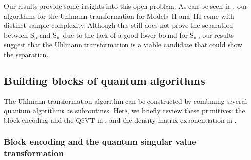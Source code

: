 Our results provide some insights into this open problem.
As can be seen in , our algorithms for the Uhlmann transformation for Models~II and~III come with distinct sample complexity.
Although this still does not prove the separation between $\mathrm{S}_{\mathrm{p}}$ and $\mathrm{S}_{\mathrm{m}}$ due to the lack of a good lower bound for $\mathrm{S}_{\mathrm{m}}$, our results suggest that the Uhlmann transformation is a viable candidate that could show the separation.











\subsection{Building blocks of quantum algorithms}
\label{sec:previous key subroutine}


The Uhlmann transformation algorithm can be constructed by combining several quantum algorithms as subroutines. 
Here, we briefly review these primitives: the block-encoding and the QSVT in , and the density matrix exponentiation in .


\subsubsection{Block encoding and the quantum singular value transformation}
\label{sec:BE and QSVT intro}



